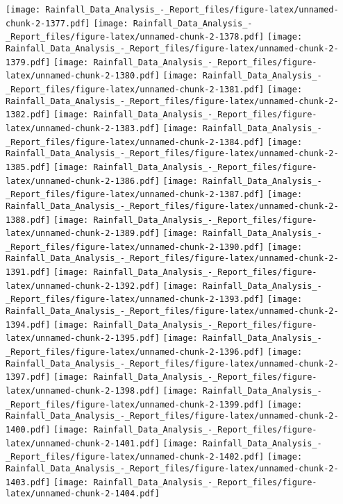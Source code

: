 \documentclass[
]{article}
\begin{document}
\texttt{[image: Rainfall\_Data\_Analysis\_-\_Report\_files/figure-latex/unnamed-chunk-2-1377.pdf]}
\texttt{[image: Rainfall\_Data\_Analysis\_-\_Report\_files/figure-latex/unnamed-chunk-2-1378.pdf]}
\texttt{[image: Rainfall\_Data\_Analysis\_-\_Report\_files/figure-latex/unnamed-chunk-2-1379.pdf]}
\texttt{[image: Rainfall\_Data\_Analysis\_-\_Report\_files/figure-latex/unnamed-chunk-2-1380.pdf]}
\texttt{[image: Rainfall\_Data\_Analysis\_-\_Report\_files/figure-latex/unnamed-chunk-2-1381.pdf]}
\texttt{[image: Rainfall\_Data\_Analysis\_-\_Report\_files/figure-latex/unnamed-chunk-2-1382.pdf]}
\texttt{[image: Rainfall\_Data\_Analysis\_-\_Report\_files/figure-latex/unnamed-chunk-2-1383.pdf]}
\texttt{[image: Rainfall\_Data\_Analysis\_-\_Report\_files/figure-latex/unnamed-chunk-2-1384.pdf]}
\texttt{[image: Rainfall\_Data\_Analysis\_-\_Report\_files/figure-latex/unnamed-chunk-2-1385.pdf]}
\texttt{[image: Rainfall\_Data\_Analysis\_-\_Report\_files/figure-latex/unnamed-chunk-2-1386.pdf]}
\texttt{[image: Rainfall\_Data\_Analysis\_-\_Report\_files/figure-latex/unnamed-chunk-2-1387.pdf]}
\texttt{[image: Rainfall\_Data\_Analysis\_-\_Report\_files/figure-latex/unnamed-chunk-2-1388.pdf]}
\texttt{[image: Rainfall\_Data\_Analysis\_-\_Report\_files/figure-latex/unnamed-chunk-2-1389.pdf]}
\texttt{[image: Rainfall\_Data\_Analysis\_-\_Report\_files/figure-latex/unnamed-chunk-2-1390.pdf]}
\texttt{[image: Rainfall\_Data\_Analysis\_-\_Report\_files/figure-latex/unnamed-chunk-2-1391.pdf]}
\texttt{[image: Rainfall\_Data\_Analysis\_-\_Report\_files/figure-latex/unnamed-chunk-2-1392.pdf]}
\texttt{[image: Rainfall\_Data\_Analysis\_-\_Report\_files/figure-latex/unnamed-chunk-2-1393.pdf]}
\texttt{[image: Rainfall\_Data\_Analysis\_-\_Report\_files/figure-latex/unnamed-chunk-2-1394.pdf]}
\texttt{[image: Rainfall\_Data\_Analysis\_-\_Report\_files/figure-latex/unnamed-chunk-2-1395.pdf]}
\texttt{[image: Rainfall\_Data\_Analysis\_-\_Report\_files/figure-latex/unnamed-chunk-2-1396.pdf]}
\texttt{[image: Rainfall\_Data\_Analysis\_-\_Report\_files/figure-latex/unnamed-chunk-2-1397.pdf]}
\texttt{[image: Rainfall\_Data\_Analysis\_-\_Report\_files/figure-latex/unnamed-chunk-2-1398.pdf]}
\texttt{[image: Rainfall\_Data\_Analysis\_-\_Report\_files/figure-latex/unnamed-chunk-2-1399.pdf]}
\texttt{[image: Rainfall\_Data\_Analysis\_-\_Report\_files/figure-latex/unnamed-chunk-2-1400.pdf]}
\texttt{[image: Rainfall\_Data\_Analysis\_-\_Report\_files/figure-latex/unnamed-chunk-2-1401.pdf]}
\texttt{[image: Rainfall\_Data\_Analysis\_-\_Report\_files/figure-latex/unnamed-chunk-2-1402.pdf]}
\texttt{[image: Rainfall\_Data\_Analysis\_-\_Report\_files/figure-latex/unnamed-chunk-2-1403.pdf]}
\texttt{[image: Rainfall\_Data\_Analysis\_-\_Report\_files/figure-latex/unnamed-chunk-2-1404.pdf]}
\end{document}
